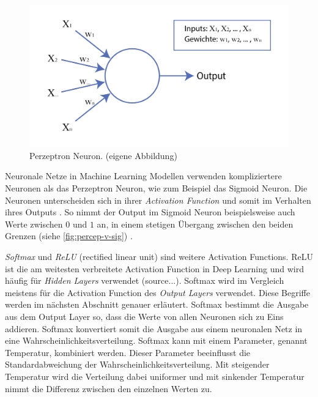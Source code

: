 \begin{figure}[!ht]
   \centering
   \includegraphics[width=\textwidth]{images/theorie/neuron.png}
   \caption{Perzeptron Neuron. (eigene Abbildung)}\label{fig:neuron}
\end{figure}
 
Neuronale Netze in Machine Learning Modellen verwenden kompliziertere Neuronen
als das Perzeptron Neuron, wie zum Beispiel das Sigmoid Neuron. Die Neuronen
unterscheiden sich in ihrer \emph{Activation Function} und somit im Verhalten ihres
Outputs \cite{pragati_baheti_activation_2022}. So nimmt der Output im Sigmoid Neuron
beispielsweise auch Werte zwischen $0$ und $1$ an, in einem stetigen Übergang
zwischen den beiden Grenzen (siehe \autoref{fig:percep-v-sig}) \cite{kumar_sigmoid_2019}.

\emph{Softmax} und \emph{ReLU} (rectified linear unit) sind weitere Activation
Functions. ReLU ist die am weitesten verbreitete Activation Function in Deep
Learning und wird häufig für \emph{Hidden Layers} verwendet (source...). Softmax wird im   %
Vergleich meistens für die Activation Function des \emph{Output Layers}                   %
verwendet. Diese Begriffe werden im nächsten Abschnitt genauer erläutert.
Softmax bestimmt die Ausgabe aus dem Output Layer so, dass die Werte von allen
Neuronen sich zu Eins addieren. Softmax konvertiert somit die Ausgabe aus einem
neuronalen Netz in eine Wahrscheinlichkeitsverteilung. Softmax kann mit einem
Parameter, genannt Temperatur, kombiniert werden. Dieser Parameter beeinflusst
die Standardabweichung der Wahrscheinlichkeitsverteilung. Mit steigender
Temperatur wird die Verteilung dabei uniformer und mit sinkender Temperatur
nimmt die Differenz zwischen den einzelnen Werten zu.

